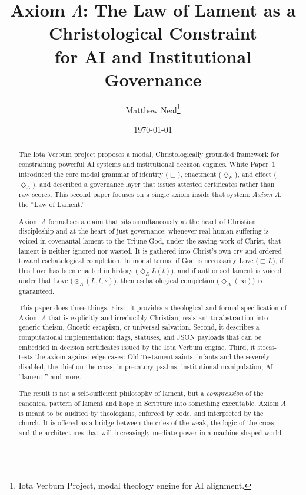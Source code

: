 \documentclass[11pt]{article}
\title{Axiom $\Lambda$: The Law of Lament as a Christological Constraint\\
for AI and Institutional Governance}
\author{Matthew Neal\thanks{Iota Verbum Project, modal theology engine for AI alignment.}}
\date{\today}
\begin{document}
\maketitle

\begin{abstract}
The Iota Verbum project proposes a modal, Christologically grounded framework for constraining powerful AI systems and institutional decision engines. White Paper~1 introduced the core modal grammar of identity ($\Box$), enactment ($\Diamond_E$), and effect ($\Diamond_\Delta$), and described a governance layer that issues attested certificates rather than raw scores. This second paper focuses on a single axiom inside that system: \emph{Axiom $\Lambda$}, the ``Law of Lament.''

Axiom $\Lambda$ formalises a claim that sits simultaneously at the heart of Christian discipleship and at the heart of just governance: whenever real human suffering is voiced in covenantal lament to the Triune God, under the saving work of Christ, that lament is neither ignored nor wasted. It is gathered into Christ's own cry and ordered toward eschatological completion. In modal terms: if God is necessarily Love ($\Box L$), if this Love has been enacted in history ($\Diamond_E L(t)$), and if authorised lament is voiced under that Love ($\otimes_{\Lambda}(L,t,s)$), then eschatological completion ($\Diamond_{\Delta}(\infty)$) is guaranteed.

This paper does three things. First, it provides a theological and formal specification of Axiom $\Lambda$ that is explicitly and irreducibly Christian, resistant to abstraction into generic theism, Gnostic escapism, or universal salvation. Second, it describes a computational implementation: flags, statuses, and JSON payloads that can be embedded in decision certificates issued by the Iota Verbum engine. Third, it stress-tests the axiom against edge cases: Old Testament saints, infants and the severely disabled, the thief on the cross, imprecatory psalms, institutional manipulation, AI ``lament,'' and more.

The result is not a self-sufficient philosophy of lament, but a \emph{compression} of the canonical pattern of lament and hope in Scripture into something executable. Axiom $\Lambda$ is meant to be audited by theologians, enforced by code, and interpreted by the church. It is offered as a bridge between the cries of the weak, the logic of the cross, and the architectures that will increasingly mediate power in a machine-shaped world.
\end{abstract}
\end{document}

